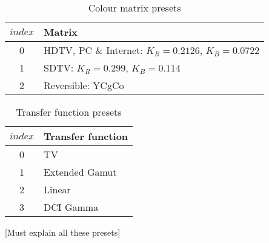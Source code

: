 \begin{table}[!ht]
\centering
\begin{tabular}{|c|l|}
\hline
$index$ &  {\bf Matrix}\\
\hline
0 & HDTV, PC \& Internet: $K_R=0.2126$, $K_B=0.0722$ \\ 
\hline
1 & SDTV: $K_R=0.299$, $K_B=0.114$ \\
\hline
2 & Reversible: YCgCo \\
\hline
\end{tabular}
\caption{Colour matrix presets}\label{table:matrixvalues}
\end{table}

\begin{table}[!ht]
\centering
\begin{tabular}{|c|l|}
\hline
$index$ & {\bf Transfer function}\\
\hline
0 & TV \\ 
\hline
1 & Extended Gamut \\
\hline
2 & Linear\\
\hline
3 & DCI Gamma\\
\hline
\end{tabular}
\caption{Transfer function presets}\label{table:transfervalues}
\end{table}

[Must explain all these presets]